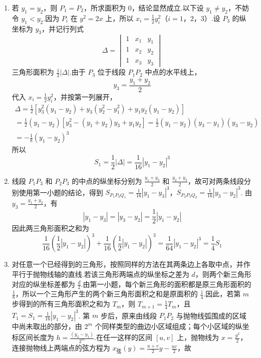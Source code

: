 \documentclass[UTF8,a4paper,oneside,11pt]{ctexbook}
\begin{document}
\begin{solution}
\begin{enumerate}
\item 若 \(y_1=y_2\)，则 \(P_1=P_2\)，所求面积为 \(0\)，结论显然成立.以下设 \(y_1\ne y_2\)，不妨令 \(y_1<y_2\).因为 \(P_i\) 在 \(y^2=2x\) 上，所以 \(x_i=\frac12y_i^2\)（\(i=1\)，\(2\)，\(3\)）.设 \(P_3\) 的纵坐标为 \(y_3\)，并记行列式
\[
\Delta=\begin{vmatrix}
1 & x_1 & y_1\\
1 & x_2 & y_2\\
1 & x_3 & y_3
\end{vmatrix}
\]
三角形面积为 \(\frac12|\Delta|\).由于 \(P_3\) 位于线段 \(P_1P_2\) 中点的水平线上，
\[
y_3=\frac{y_1+y_2}{2}
\]
代入 \(x_i=\frac12y_i^2\)，并按第一列展开，
\[
\begin{gathered}
\Delta=\frac12\left[y_3^2(y_1-y_2)+y_3(y_2^2-y_1^2)+y_1y_2(y_1-y_2)\right]\\
=\frac12(y_1-y_2)\left[y_3^2-(y_1+y_2)y_3+y_1y_2\right]
=\frac12(y_1-y_2)(y_3-y_1)(y_3-y_2)\\
=-\frac18(y_1-y_2)^3
\end{gathered}
\]
所以
\[
S_1=\frac12|\Delta|=\frac1{16}|y_1-y_2|^3
\]

\item 线段 \(P_1P_3\) 和 \(P_2P_3\) 的中点的纵坐标分别为 \(\frac{y_1+y_3}{2}\) 和 \(\frac{y_2+y_3}{2}\)，故可对两条线段分别使用第一小题的结论，得到 \(S_{P_1P_3Q_1}=\frac1{16}|y_1-y_3|^3\)，\(S_{P_2P_3Q_2}=\frac1{16}|y_3-y_2|^3\).
由 \(y_3=\frac{y_1+y_2}{2}\)，有
\[
|y_1-y_3|=|y_3-y_2|=\frac12|y_1-y_2|
\]
因此两三角形面积之和为
\[
\frac1{16}\left(\frac12|y_1-y_2|\right)^3+\frac1{16}\left(\frac12|y_1-y_2|\right)^3
=\frac1{64}|y_1-y_2|^3=\frac14S_1
\]

\item 对任意一个已经得到的三角形，按照同样的方法在其两条边上各取中点，并作平行于抛物线轴的直线.若该三角形两端点的纵坐标之差为 \(d\)，则两个新三角形对应的纵坐标差都为 \(\frac{d}{2}\).由第一小题，每个新三角形的面积都是原三角形面积的 \(\frac18\)，所以一个三角形产生的两个新三角形面积之和是原面积的 \(\frac14\).因此，若第 \(m\) 步得到的所有三角形面积之和为 \(T_m\)，则
\(T_{m+1}=\frac14T_m\)，且 \(T_1=S_1=\frac1{16}|y_1-y_2|^3\).
第 \(m\) 步后，原来由线段 \(P_1P_2\) 与抛物线弧围成的区域中尚未取出的部分，由 \(2^m\) 个同样类型的曲边小区域组成；每个小区域的纵坐标区间长度为 \(h=\frac{(y_2-y_1)}{2^m}\).在任一这样的区间 \([u,v]\) 上，抛物线为 \(x=\frac{y^2}{2}\)，连接抛物线上两端点的弦方程为 \(x_{\text{弦}}(y)=\frac{u+v}{2}y-\frac{uv}{2}\)，故


\end{enumerate}
\end{solution}
\end{document}
